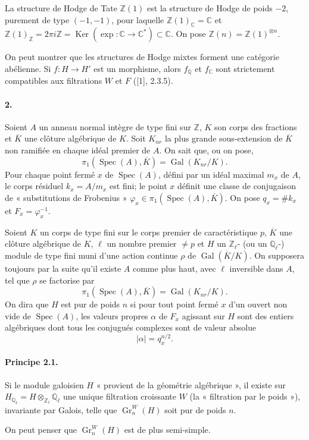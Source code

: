 \documentclass[10pt]{article}
\newcommand{\C}{\mathbb C}
\newcommand{\Q}{\mathbb Q}
\newcommand{\Z}{\mathbb Z}
\newcommand{\Ql}{\mathbb Q_\ell}
\newcommand{\Zl}{\mathbb Z_\ell}
\newcommand{\Gr}{\operatorname{Gr}}
\newcommand{\Gal}{\operatorname{Gal}}
\newcommand{\Spec}{\operatorname{Spec}}
\newcommand{\Ker}{\operatorname{Ker}}
\newcommand{\barK}{\overline{K}}
\begin{document}
La structure de Hodge de Tate $\Z(1)$ est la structure de Hodge de poids $-2$, purement de type $(-1,-1)$, pour laquelle $\Z(1)_\C=\C$ et $\Z(1)_\Z=2\pi i\Z=\Ker(\exp:\C\to\C^*)\subset\C$. On pose $\Z(n)=\Z(1)^{\otimes n}$.

On peut montrer que les structures de Hodge mixtes forment une catégorie abélienne. Si $f:H\to H'$ est un morphisme, alors $f_\Q$ et $f_\C$ sont strictement compatibles aux filtrations $W$ et $F$ ([1], 2.3.5).

\paragraph{2.} Soient $A$ un anneau normal intègre de type fini sur $\Z$, $K$ son corps des fractions et $\barK$ une clôture algébrique de $K$. Soit $K_{nr}$ la plus grande sous-extension de $\barK$ non ramifiée en chaque idéal premier de $A$. On sait que, ou on pose,
\[
\pi_1(\Spec(A),\barK)=\Gal(K_{nr}/K).
\]
Pour chaque point fermé $x$ de $\Spec(A)$, défini par un idéal maximal $m_x$ de $A$, le corps résiduel $k_x=A/m_x$ est fini; le point $x$ définit une classe de conjugaison de « substitutions de Frobenius » $\varphi_x\in\pi_1(\Spec(A),\barK)$. On pose $q_x=\#k_x$ et $F_x=\varphi_x^{-1}$.

Soient $K$ un corps de type fini sur le corps premier de caractéristique $p$, $\barK$ une clôture algébrique de $K$, $\ell$ un nombre premier $\ne p$ et $H$ un $\Zl$- (ou un $\Ql$-) module de type fini muni d'une action continue $\rho$ de $\Gal(\barK/K)$. On supposera toujours par la suite qu'il existe $A$ comme plus haut, avec $\ell$ inversible dans $A$, tel que $\rho$ se factorise par
\[
\pi_1(\Spec(A),\barK)=\Gal(K_{nr}/K).
\]
On dira que $H$ est pur de poids $n$ si pour tout point fermé $x$ d'un ouvert non vide de $\Spec(A)$, les valeurs propres $\alpha$ de $F_x$ agissant sur $H$ sont des entiers algébriques dont tous les conjugués complexes sont de valeur absolue
\[
|\alpha|=q_x^{n/2}.
\]

\paragraph{Principe 2.1.} Si le module galoisien $H$ « provient de la géométrie algébrique », il existe sur $H_{\Ql}=H\otimes_{\Zl}\Ql$ une unique filtration croissante $W$ (la « filtration par le poids »), invariante par Galois, telle que $\Gr_n^W(H)$ soit pur de poids $n$.

On peut penser que $\Gr_n^W(H)$ est de plus semi-simple.
\end{document}

